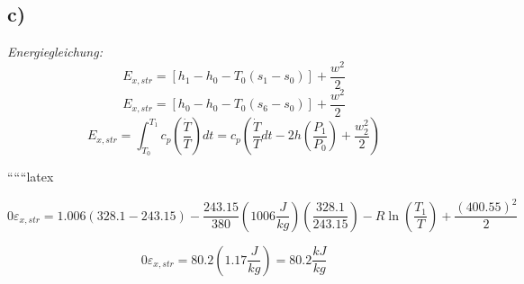 

\subsection*{c)}
\textit{Energiegleichung:}
\[
E_{x,str} = \left[ h_1 - h_0 - T_0 (s_1 - s_0) \right] + \frac{w^2}{2}
\]
\[
E_{x,str} = \left[ h_0 - h_0 - T_0 (s_6 - s_0) \right] + \frac{w^2}{2}
\]
\[
E_{x,str} = \int_{T_0}^{T_1} c_p \left( \frac{\dot{T}}{T} \right) dt = c_p \left( \frac{\dot{T}}{T} dt - 2h \left( \frac{P_1}{P_0} \right) + \frac{w_2^2}{2} \right)
\]

``````latex


\[
0 \varepsilon_{x,str} = 1.006 (328.1 - 243.15) - \frac{243.15}{380} (1006 \frac{J}{kg}) \left( \frac{328.1}{243.15} \right) - R \ln \left( \frac{T_1}{T} \right) + \frac{(400.55)^2}{2}
\]

\[
0 \varepsilon_{x,str} = 80.2 (1.17 \frac{J}{kg}) = 80.2 \frac{kJ}{kg}
\]